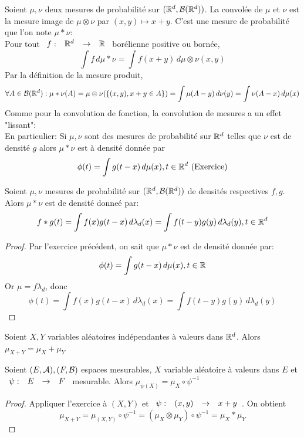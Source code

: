 \documentclass[]{report}
\begin{document}
    \begin{df}{}{}
        Soient $\mu,\nu$ deux mesures de probabilité sur $(\mathbb{R}^d,\mathcal{B}(\mathbb{R}^d))$. La convolée de $\mu$ et $\nu$ est la mesure image de $\mu\otimes \nu$ par $(x,y)\mapsto x+y$. C'est une mesure de probabilité que l'on note $\mu*\nu$:\\
        Pour tout $\begin{array}{ccccc} f : & \mathbb{R}^d & \to & \mathbb{R} \end{array}$ borélienne positive ou bornée,
        \[\int f\,d\mu*\nu =\int f(x+y)\,d\mu\otimes \nu(x,y)\]
        Par la définition de la mesure produit,
        \[\forall A\in \mathcal{B}(\mathbb{R}^d):\mu*\nu(A)=\mu\otimes \nu(\{(x,y),x+y\in A\})=\int \mu(A-y)\,d\nu(y)=\int \nu(A-x)\,d\mu(x)\]
        Comme pour la convolution de fonction, la convolution de mesures a un effet "lissant":\\
        En particulier: Si $\mu,\nu$ sont des mesures de probabilité sur $\mathbb{R}^d$ telles que $\nu$ est de densité $g$ alors $\mu*\nu$ est à densité donnée par
        \[\phi(t)=\int g(t-x)\,d\mu(x),t\in \mathbb{R}^d\text{ (Exercice)}\]
    \end{df}

    \begin{prop}{}{}
        Soient $\mu,\nu$ mesures de probabilité sur $(\mathbb{R}^d,\mathcal{B}(\mathbb{R}^d))$ de densités respectives $f,g$. Alors $\mu *\nu$ est de densité donneé par:
        \[f*g(t)=\int f(x)g(t-x)\,d\lambda_d(x)=\int f(t-y)g(y)\,d\lambda_d(y),t\in\mathbb{R}^d\]
    \end{prop}

    \begin{proof}
        Par l'exercice précédent, on sait que $\mu*\nu$ est de densité donnée par:
        \[\phi(t)=\int g(t-x)\,d\mu(x),t\in \mathbb{R}\]
        Or $\mu=f \lambda_d$, donc
        \[\phi(t)=\int f(x)g(t-x)\,d\lambda_d(x)=\int f(t-y)g(y)\,d\lambda_d(y)\]
    \end{proof}

    \begin{prop}{}{}
        Soient $X,Y$ variables aléatoires indépendantes à valeurs dans $\mathbb{R}^d$. Alors $\mu_{X+Y}=\mu_X+\mu_Y$
    \end{prop}

    \begin{ex}{}{}
        Soient $(E,\mathcal{A}),(F,\mathcal{B})$ espaces mesurables, $X$ variable aléatoire à valeurs dans $E$ et $\begin{array}{ccccc} \psi : & E & \to & F \end{array}$ mesurable. Alors $\mu_{\psi(X)}=\mu_X\circ\psi^{-1}$
    \end{ex}

    \begin{proof}
        Appliquer l'exercice à $(X,Y)$ et $\begin{array}{ccccc} \psi : & (x,y) & \to & x+y \end{array}$. On obtient
        \[\mu_{X+Y}=\mu_{(X,Y)}\circ\psi^{-1}=(\mu_X\otimes \mu_Y)\circ \psi^{-1}=\mu_X*\mu_Y\]
    \end{proof}
\end{document}
